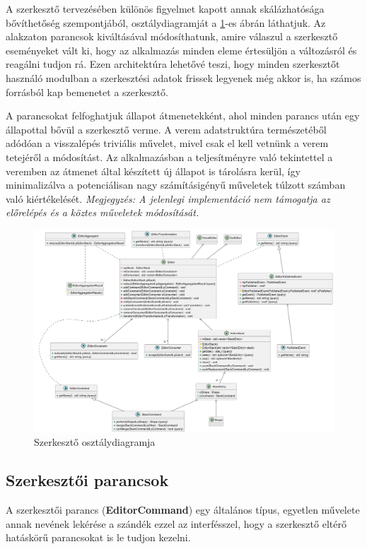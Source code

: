 A szerkesztő tervezésében különös figyelmet kapott annak skálázhatósága bővíthetőség szempontjából, osztálydiagramját a \ref{fig:class_editor-1}-es ábrán láthatjuk. Az alakzaton parancsok kiváltásával módosíthatunk, amire válaszul a szerkesztő eseményeket vált ki, hogy az alkalmazás minden eleme értesüljön a változásról és reagálni tudjon rá. Ezen architektúra lehetővé teszi, hogy minden szerkesztőt használó modulban a szerkesztési adatok frissek legyenek még akkor is, ha számos forrásból kap bemenetet a szerkesztő.

A parancsokat felfoghatjuk állapot átmenetekként, ahol minden parancs után egy állapottal bővül a szerkesztő verme. A verem adatstruktúra természetéből adódóan a visszalépés triviális művelet, mivel csak el kell vetnünk a verem tetejéről a módosítást. Az alkalmazásban a teljesítményre való tekintettel a veremben az átmenet által készített új állapot is tárolásra kerül, így minimalizálva a potenciálisan nagy számításigényű műveletek túlzott számban való kiértékelését. \textit{Megjegyzés: A jelenlegi implementáció nem támogatja az előrelépés és a köztes műveletek módosítását.}

\begin{figure}[H]
    \centering
    \includegraphics[width=1\linewidth]{images/class_editor.png}
    \caption{Szerkesztő osztálydiagramja}
    \label{fig:class_editor-1}
\end{figure}


\subsection{Szerkesztői parancsok}

A szerkesztői parancs (\textbf{EditorCommand}) egy általános típus, egyetlen művelete annak nevének lekérése a szándék ezzel az interfésszel, hogy a szerkesztő eltérő hatáskörű parancsokat is le tudjon kezelni.

